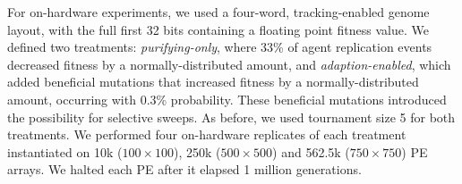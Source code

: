 

% 





For on-hardware experiments, we used a four-word, tracking-enabled genome layout, with the full first 32 bits containing a floating point fitness value.
We defined two treatments: \textit{purifying-only}, where 33\% of agent replication events decreased fitness by a normally-distributed amount,  and \textit{adaption-enabled}, which added beneficial mutations that increased fitness by a normally-distributed amount, occurring with 0.3\% probability.
These beneficial mutations introduced the possibility for selective sweeps.
As before, we used tournament size 5 for both treatments.
We performed four on-hardware replicates of each treatment instantiated on 10k ($100\times100$), 250k ($500\times500$) and 562.5k ($750\times750$) PE arrays.
We halted each PE after it elapsed 1 million generations.

